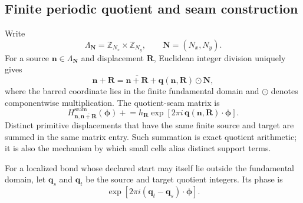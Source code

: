 \documentclass[11pt]{article}
\begin{document}
\subsection{Finite periodic quotient and seam construction}

Write
\begin{equation}
  \Lambda_{\mathbf N}
  =\mathbb Z_{N_x}\times\mathbb Z_{N_y},
  \qquad \mathbf N=(N_x,N_y).
\end{equation}
For a source $\mathbf n\in\Lambda_{\mathbf N}$ and displacement $\mathbf R$, Euclidean
integer division uniquely gives
\begin{equation}
  \mathbf n+\mathbf R
  =\overline{\mathbf n+\mathbf R}
   +\mathbf q(\mathbf n,\mathbf R)\odot\mathbf N,
  \label{eq:quotient-decomposition}
\end{equation}
where the barred coordinate lies in the finite fundamental domain and $\odot$ denotes
componentwise multiplication.  The quotient-seam matrix is
\begin{equation}
  H^{\mathrm{seam}}_{\mathbf n,
    \overline{\mathbf n+\mathbf R}}(\boldsymbol\phi)
  \mathrel{+}=
  h_{\mathbf R}\exp\!\left[
    2\pi i\,\mathbf q(\mathbf n,\mathbf R)\cdot\boldsymbol\phi
  \right].
  \label{eq:seam-matrix}
\end{equation}
Distinct primitive displacements that have the same finite source and target are summed
in the same matrix entry.  Such summation is exact quotient arithmetic; it is also the
mechanism by which small cells alias distinct support terms.

For a localized bond whose declared start may itself lie outside the fundamental
domain, let $\mathbf q_s$ and $\mathbf q_t$ be the source and target quotient integers.
Its phase is
\begin{equation}
  \exp\!\left[
    2\pi i(\mathbf q_t-\mathbf q_s)\cdot\boldsymbol\phi
  \right].
  \label{eq:localized-seam-phase}
\end{equation}
\end{document}
